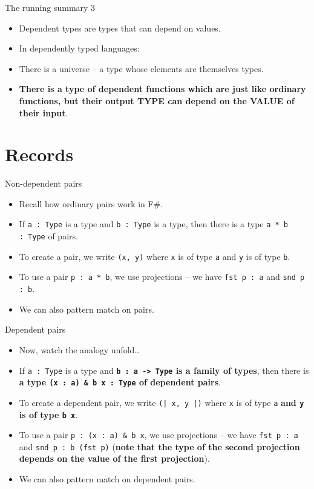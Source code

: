 \documentclass{beamer}
\newcommand{\m}[1]{\texttt{#1}}
\begin{document}
\begin{frame}{The running summary 3}
\begin{itemize}
	\item Dependent types are types that can depend on values.
	\item In dependently typed languages:
	\item There is a universe -- a type whose elements are themselves types.
	\item \textbf{There is a type of dependent functions which are just like ordinary functions, but their output TYPE can depend on the VALUE of their input}.
\end{itemize}
\end{frame}

\section{Records}

\begin{frame}{Non-dependent pairs}
\begin{itemize}
	\item Recall how ordinary pairs work in F\#.
	\item If \m{a :\ Type} is a type and \m{b :\ Type} is a type, then there is a type \m{a * b :\ Type} of pairs.
	\item To create a pair, we write \m{(x, y)} where \m{x} is of type \m{a} and \m{y} is of type \m{b}.
	\item To use a pair \m{p :\ a * b}, we use projections -- we have \m{fst p :\ a} and \m{snd p :\ b}.
	\item We can also pattern match on pairs.
\end{itemize}
\end{frame}

\begin{frame}{Dependent pairs}
\begin{itemize}
	\item Now, watch the analogy unfold\dots
	\item If \m{a :\ Type} is a type and \textbf{\m{b :\ a -> Type} is a family of types}, then there is \textbf{a type \m{(x :\ a) \& b x :\ Type} of dependent pairs}.
	\item To create a dependent pair, we write \m{(| x, y |)} where \m{x} is of type \m{a} \textbf{and \m{y} is of type \m{b x}}.
	\item To use a pair \m{p :\ (x :\ a) \& b x}, we use projections -- we have \m{fst p :\ a} and \m{snd p :\ b (fst p)} (\textbf{note that the type of the second projection depends on the value of the first projection}).
	\item We can also pattern match on dependent pairs.
\end{itemize}
\end{frame}
\end{document}
